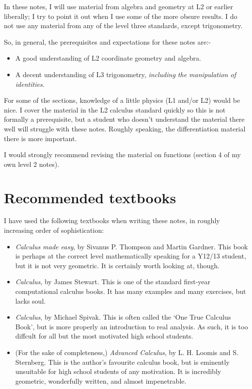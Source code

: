 \documentclass[a4paper]{memoir}
\theoremstyle{definition}
\begin{document}
In these notes, I will use material from algebra and geometry at L2 or earlier liberally;
I try to point it out when I use some of the more obsure results. I do not use any
material from any of the level three standards, except trigonometry.

So, in general, the prerequisites and expectations for these notes are:-
\begin{itemize}
  \item A good understanding of L2 coordinate geometry and algebra.
  \item A decent understanding of L3 trigonometry, \emph{including the manipulation of identities}.
\end{itemize}

For some of the sections, knowledge of a little physics (L1 and/or L2) would be nice. I cover
the material in the L2 calculus standard quickly so this is not formally a prerequisite, but a student
who doesn't understand the material there well will struggle with these notes. Roughly speaking,
the differentiation material there is more important.

I would strongly recommend revising the material on functions (section 4 of my own level 2 notes).

\section{Recommended textbooks}
I have used the following textbooks when writing these notes, in roughly increasing order of sophistication:
\begin{itemize}
  \item \emph{Calculus made easy}, by Sivanus P. Thompson and Martin Gardner. This book is perhaps at the correct level mathematically speaking
        for a Y12/13 student, but it is not very geometric. It is certainly worth looking at, though.
  \item \emph{Calculus}, by James Stewart. This is one of the standard first-year computational calculus books. It has many examples and many exercises,
        but lacks soul.
  \item \emph{Calculus}, by Michael Spivak. This is often called the `One True Calculus Book', but is more properly an introduction to
        real analysis. As such, it is too diffcult for all but the most motivated high school students.
  \item (For the sake of completeness,) \emph{Advanced Calculus}, by L. H. Loomis and S. Sternberg. This is the author's favourite calculus
        book, but is eminently unsuitable for high school students of any motivation. It is incredibly geometric, wonderfully written, and
        almost impenetrable.
\end{itemize}
\end{document}
